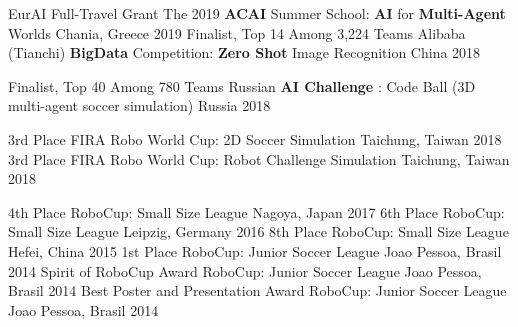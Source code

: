 



\begin{cvhonors}

  \cvhonor
    {EurAI Full-Travel Grant} %
    {The 2019 \textbf{ACAI} Summer School: \textbf{AI} for \textbf{Multi-Agent} Worlds} %
    {Chania, Greece} %
    {2019} %
  \cvhonor
    {Finalist, Top 14 Among 3,224 Teams} %
    {Alibaba (Tianchi) \textbf{BigData} Competition: \textbf{Zero Shot} Image Recognition} %
    {China} %
    {2018} %

  \cvhonor
    {Finalist, Top 40 Among 780 Teams} %
    {Russian \textbf{AI Challenge} : Code Ball (3D multi-agent soccer simulation)} %
    {Russia} %
    {2018} %

  \cvhonor
    {3rd Place} %
    {FIRA Robo World Cup: 2D Soccer Simulation} %
    {Taichung, Taiwan} %
    {2018} %
  \cvhonor
    {3rd Place} %
    {FIRA Robo World Cup: Robot Challenge Simulation} %
    {Taichung, Taiwan} %
    {2018} %
    
  \cvhonor
    {4th Place} %
    {RoboCup: Small Size League} %
    {Nagoya, Japan} %
    {2017} %
  \cvhonor
    {6th Place} %
    {RoboCup: Small Size League} %
    {Leipzig, Germany} %
    {2016} %
  \cvhonor
    {8th Place} %
    {RoboCup: Small Size League} %
    {Hefei, China} %
    {2015} %
  \cvhonor
    {1st Place} %
    {RoboCup: Junior Soccer League} %
    {Joao Pessoa, Brasil} %
    {2014} %
  \cvhonor
    {Spirit of RoboCup Award} %
    {RoboCup: Junior Soccer League} %
    {Joao Pessoa, Brasil} %
    {2014} %
  \cvhonor
    {Best Poster and Presentation Award} %
    {RoboCup: Junior Soccer League} %
    {Joao Pessoa, Brasil} %
    {2014} %
\end{cvhonors}


